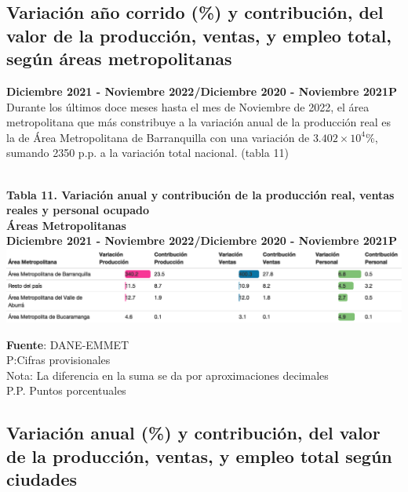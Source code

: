\documentclass[
]{article}
\begin{document}
\hypertarget{variaciuxf3n-auxf1o-corrido-y-contribuciuxf3n-del-valor-de-la-producciuxf3n-ventas-y-empleo-total-seguxfan-uxe1reas-metropolitanas-1}{%
\subsection{Variación año corrido (\%) y contribución, del valor de la
producción, ventas, y empleo total, según áreas
metropolitanas}\label{variaciuxf3n-auxf1o-corrido-y-contribuciuxf3n-del-valor-de-la-producciuxf3n-ventas-y-empleo-total-seguxfan-uxe1reas-metropolitanas-1}}

\textbf{Diciembre 2021 - Noviembre 2022/Diciembre 2020 - Noviembre
2021P}\\

Durante los últimos doce meses hasta el mes de Noviembre de 2022, el
área metropolitana que más constribuye a la variación anual de la
producción real es la de Área Metropolitana de Barranquilla con una
variación de \ensuremath{3.402\times 10^{4}}\%, sumando 2350 p.p. a la
variación total nacional. (tabla 11)\\
\strut \\

\textbf{Tabla 11. Variación anual y contribución de la producción real,
ventas reales y personal ocupado}\\
\textbf{Áreas Metropolitanas}\\
\textbf{Diciembre 2021 - Noviembre 2022/Diciembre 2020 - Noviembre
2021P}\\

\includegraphics{boletin_files/figure-latex/tabla11_view-1.png}

\textbf{Fuente}: DANE-EMMET\\
P:Cifras provisionales\\
Nota: La diferencia en la suma se da por aproximaciones decimales\\
P.P. Puntos porcentuales\\

\hypertarget{variaciuxf3n-anual-y-contribuciuxf3n-del-valor-de-la-producciuxf3n-ventas-y-empleo-total-seguxfan-ciudades-2}{%
\subsection{Variación anual (\%) y contribución, del valor de la
producción, ventas, y empleo total según
ciudades}\label{variaciuxf3n-anual-y-contribuciuxf3n-del-valor-de-la-producciuxf3n-ventas-y-empleo-total-seguxfan-ciudades-2}}
\end{document}
